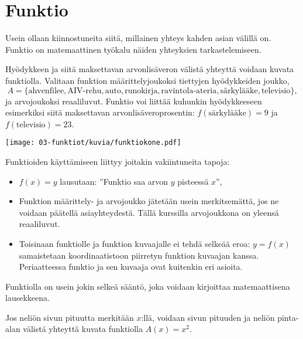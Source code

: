 \chapter{Funktio}

Usein ollaan kiinnostuneita siitä, millainen yhteys kahden asian välillä
on. Funktio on matemaattinen työkalu näiden yhteyksien tarkastelemiseen.


\begin{esimerkki}
Hyödykkeen ja siitä maksettavan arvonlisäveron välistä yhteyttä
voidaan kuvata funktiolla. Valitaan funktion määrittelyjoukoksi
tiettyjen hyödykkeiden joukko,
\[
A = \{\text{ahvenfilee}, \text{AIV-rehu}, \text{auto}, \text{runokirja}, \text{ravintola-ateria}, \text{särkylääke}, \text{televisio}\},
\]
ja arvojoukoksi reaaliluvut. Funktio voi liittää kuhunkin hyödykkeeseen
esimerkiksi siitä maksettavan arvonlisäveroprosentin:
$f(\text{särkylääke}) = 9$ ja $f(\text{televisio}) = 23$.

\begin{center}
\texttt{[image: 03-funktiot/kuvia/funktiokone.pdf]}
\end{center}
\end{esimerkki}

Funktioiden käyttämiseen liittyy joitakin vakiintuneita tapoja:
\begin{itemize}
\item $f(x) = y$ lausutaan: ''Funktio saa arvon $y$ pisteessä $x$'',
\item Funktion määrittely- ja arvojoukko jätetään usein merkitsemättä, jos ne voidaan päätellä asiayhteydestä. Tällä kurssilla arvojoukkona on yleensä reaaliluvut.
\item Toisinaan funktiolle ja funktion kuvaajalle ei tehdä selkeää eroa:
$y = f(x)$ samaistetaan koordinaatistoon piirretyn funktion kuvaajan kanssa.
Periaatteessa funktio ja sen kuvaaja ovat kuitenkin eri asioita.
\end{itemize}

Funktiolla on usein jokin selkeä sääntö, joka voidaan kirjoittaa
matemaattisena lausekkeena.

\begin{esimerkki}
Jos neliön sivun pituutta merkitään $x$:llä, voidaan sivun pituuden
ja neliön pinta-alan välistä yhteyttä kuvata funktiolla
$A(x) = x^2$.
\end{esimerkki}

